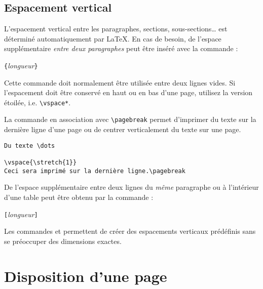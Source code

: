 \subsection{Espacement vertical}

L'espacement vertical entre les paragraphes, sections,
sous-sections\dots{} est déterminé automatiquement par \LaTeX{}.
En cas de besoin, de l'espace supplémentaire
\emph{entre deux paragraphes} peut être inséré avec la commande :
\begin{lscommand}
\verb|{|\emph{longueur}\verb|}|
\end{lscommand}

Cette commande doit normalement être utilisée entre deux lignes
vides. Si l'espacement doit être conservé en haut ou en bas d'une
page, utilisez la version étoilée, i.e. \verb|\vspace*|.

La commande  en association avec \verb|\pagebreak| permet
d'imprimer du texte sur la dernière ligne d'une page ou de centrer
verticalement du texte sur une page.
\begin{code}
\begin{verbatim}
Du texte \dots

\vspace{\stretch{1}}
Ceci sera imprimé sur la dernière ligne.\pagebreak
\end{verbatim}
\end{code}

De l'espace supplémentaire entre deux lignes du \emph{même} paragraphe
ou à l'intérieur d'une table peut être obtenu par la commande :
\begin{lscommand}
\ci{\bs}\verb|[|\emph{longueur}\verb|]|
\end{lscommand}

Les commandes  et  permettent de créer des
espacements verticaux prédéfinis sans se préoccuper des dimensions
exactes.

\section{Disposition d'une page}

